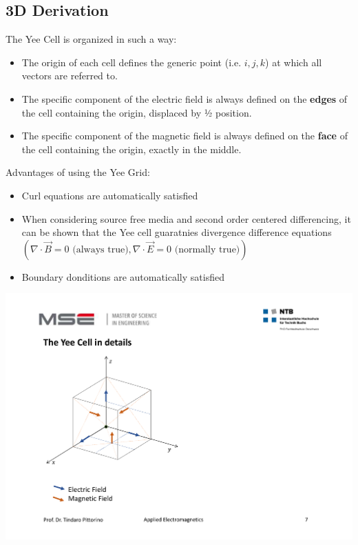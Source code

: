 \subsection{3D Derivation}
\begin{minipage}{12cm}
	The Yee Cell is organized in such a way: \\
	\begin{itemize}
		\item The origin of each cell defines the generic point (i.e. $i,j,k$) at which all vectors are referred to.
		\item The specific component of the electric field is always defined on the \textbf{edges} of the cell containing the origin, displaced by ½ position.
		\item The specific component of the magnetic field is always defined on the \textbf{face} of the cell containing the origin, exactly in the middle.
	\end{itemize}
	Advantages of using the Yee Grid: \\
	\begin{itemize}
		\item Curl equations are automatically satisfied
		\item When considering source free media and second order centered differencing, it can be shown that the Yee cell guaratnies divergence difference equations \(\displaystyle \left(\nabla \cdot \vec{B} = 0 \textrm{ (always true)}, \nabla \cdot \vec{E} = 0 \textrm{ (normally true)} \right)\) 
		\item Boundary donditions are automatically satisfied
	\end{itemize}
\end{minipage}
\begin{minipage}{7cm}
	\begin{flushright}
	\includegraphics[width=.95\textwidth]{./images/Yee.pdf}
	\end{flushright}
\end{minipage}

